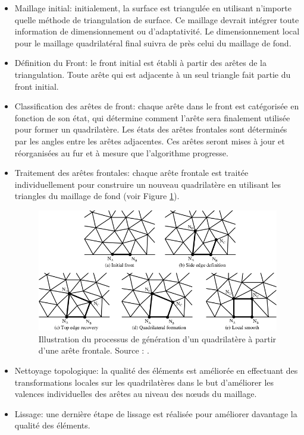 \begin{itemize}
    \item Maillage initial: initialement, la surface est triangulée en utilisant n'importe quelle méthode de triangulation de surface. Ce maillage devrait intégrer toute information de dimensionnement ou d'adaptativité. Le dimensionnement local pour le maillage quadrilatéral final suivra de près celui du maillage de fond.\\

    \item Définition du Front: le front initial est établi à partir des arêtes de la triangulation. Toute arête qui est adjacente à un seul triangle fait partie du front initial.\\

    \item Classification des arêtes de front: chaque arête dans le front est catégorisée en fonction de son état, qui détermine comment l'arête sera finalement utilisée pour former un quadrilatère. Les états des arêtes frontales sont déterminés par les angles entre les arêtes adjacentes. Ces arêtes seront mises à jour et réorganisées au fur et à mesure que l'algorithme progresse.\\

    \item Traitement des arêtes frontales: chaque arête frontale est traitée individuellement pour construire un nouveau quadrilatère en utilisant les triangles du maillage de fond (voir Figure \ref{fig:step_front_advancing}).

    \begin{figure}[!h]
    \centering
    \includegraphics[scale=0.6]{images/step_front_advancing.png}
    \caption{Illustration du processus de génération d'un quadrilatère à partir d'une arête frontale. Source : \cite{owen1999q}.}
    \label{fig:step_front_advancing}
    \end{figure}

    \item Nettoyage topologique: la qualité des éléments est améliorée en effectuant des transformations locales sur les quadrilatères dans le but d'améliorer les valences individuelles des arêtes au niveau des nœuds du maillage.\\

    \item Lissage: une dernière étape de lissage est réalisée pour améliorer davantage la qualité des éléments.\\
\end{itemize}


